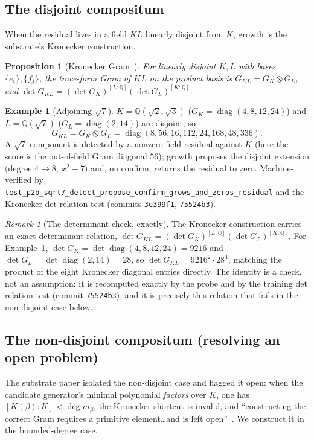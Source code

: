 \documentclass[11pt]{article}
\theoremstyle{plain}
\newtheorem{proposition}[theorem]{Proposition}
\theoremstyle{definition}
\newtheorem{example}[theorem]{Example}
\theoremstyle{remark}
\newtheorem{remark}[theorem]{Remark}
\newcommand{\Q}{\mathbb{Q}}
\newcommand{\K}{K}
\newcommand{\GG}{G}
\DeclareMathOperator{\diag}{diag}
\begin{document}
\subsection{The disjoint compositum}\label{subsec:disjoint}
When the residual lives in a field $\K L$ linearly disjoint from $\K$, growth is the substrate's Kronecker
construction.

\begin{proposition}[Kronecker Gram~{\cite[Prop.~4.6]{VectorSubstrate}}]\label{prop:kron}
For linearly disjoint $\K,L$ with bases $\{e_i\},\{f_j\}$, the trace-form Gram of $\K L$ on the product basis
is $\GG_{\K L}=\GG_\K\otimes\GG_L$, and $\det\GG_{\K L}=(\det\GG_\K)^{[L:\Q]}(\det\GG_L)^{[\K:\Q]}$.
\end{proposition}

\begin{example}[Adjoining $\sqrt7$]\label{ex:sqrt7}
$\K=\Q(\sqrt2,\sqrt3)$ ($\GG_\K=\diag(4,8,12,24)$) and $L=\Q(\sqrt7)$ ($\GG_L=\diag(2,14)$) are disjoint, so
\[
  \GG_{\K L}=\GG_\K\otimes\GG_L=\diag(8,56,16,112,24,168,48,336).
\]
A $\sqrt7$-component is detected by a nonzero field-residual against $\K$ (here the score is the out-of-field
Gram diagonal $56$); growth proposes the disjoint extension $\big(\text{degree }4\to8,\ x^2-7\big)$ and, on
confirm, returns the residual to zero. Machine-verified by
\texttt{test\_p2b\_sqrt7\_detect\_propose\_confirm\_grows\_and\_zeros\_residual} and the Kronecker
det-relation test (commits \texttt{3e399f1}, \texttt{75524b3}).
\end{example}

\begin{remark}[The determinant check, exactly]\label{rem:detrel}
The Kronecker construction carries an exact determinant relation,
$\det\GG_{\K L}=(\det\GG_\K)^{[L:\Q]}(\det\GG_L)^{[\K:\Q]}$. For Example~\ref{ex:sqrt7},
$\det\GG_\K=\det\diag(4,8,12,24)=9216$ and $\det\GG_L=\det\diag(2,14)=28$, so
$\det\GG_{\K L}=9216^{2}\cdot28^{4}$, matching the product of the eight Kronecker diagonal entries directly.
The identity is a check, not an assumption: it is recomputed exactly by the probe and by the training det
relation test (commit \texttt{75524b3}), and it is precisely this relation that fails in the non-disjoint case
below.
\end{remark}

\subsection{The non-disjoint compositum (resolving an open problem)}\label{subsec:nondisjoint}
The substrate paper isolated the non-disjoint case and flagged it open: when the candidate generator's
minimal polynomial \emph{factors} over $\K$, one has $[\K(\beta):\K]<\deg m_\beta$, the Kronecker shortcut is
invalid, and ``constructing the correct Gram requires a primitive element\dots and is left
open''~\cite[Rem.~4.7, O4]{VectorSubstrate}. We construct it in the bounded-degree case.
\end{document}
